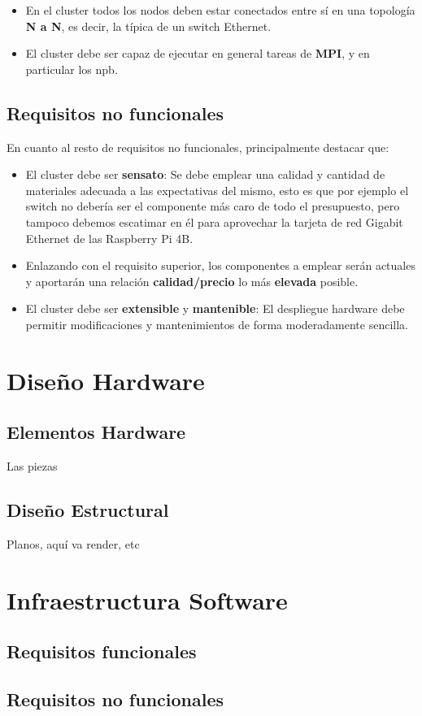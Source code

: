 \begin{itemize}
    \item En el cluster todos los nodos deben estar conectados entre sí en una topología \textbf{N a N}, es decir, la típica de un switch Ethernet.
    \item El cluster debe ser capaz de ejecutar en general tareas de \textbf{MPI}, y en particular los \acrlong{npb}.
\end{itemize}

\subsection{Requisitos no funcionales}
En cuanto al resto de requisitos no funcionales, principalmente destacar que:
\begin{itemize}
    \item El cluster debe ser \textbf{sensato}: Se debe emplear una calidad y cantidad de materiales adecuada a las expectativas del mismo, esto es que por ejemplo el switch no debería ser el componente más caro de todo el presupuesto, pero tampoco debemos escatimar en él para aprovechar la tarjeta de red Gigabit Ethernet de las Raspberry Pi 4B.
    \item Enlazando con el requisito superior, los componentes a emplear serán actuales y aportarán una relación \textbf{calidad/precio} lo más \textbf{elevada} posible.
    \item El cluster debe ser \textbf{extensible} y \textbf{mantenible}: El despliegue hardware debe permitir modificaciones y mantenimientos de forma moderadamente sencilla.
\end{itemize}

\section{Diseño Hardware}
\label{sec:diseño_hardware}


\subsection{Elementos Hardware}
Las piezas

\subsection{Diseño Estructural}
Planos, aquí va render, etc

\section{Infraestructura Software}
\label{sec:infra_software}

\subsection{Requisitos funcionales}

\subsection{Requisitos no funcionales}

